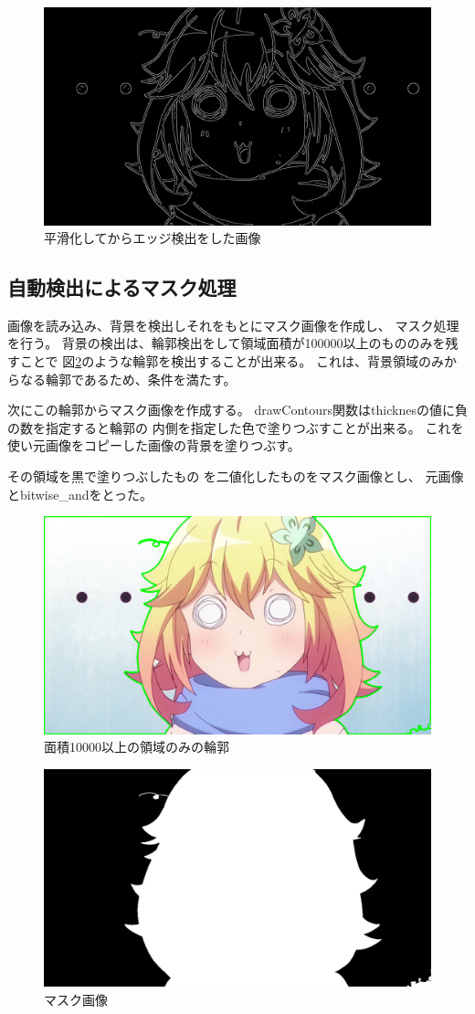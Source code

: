\documentclass[dvipdfmx]{jsarticle}
\begin{document}
\begin{figure}[htbp]
  \centering
  \includegraphics[width=0.7\hsize]{../pic/canny2.png}
  \caption{平滑化してからエッジ検出をした画像}
  \label{fig:canny2}
\end{figure}

\newpage
\subsection{自動検出によるマスク処理}

画像を読み込み、背景を検出しそれをもとにマスク画像を作成し、
マスク処理を行う。
背景の検出は、輪郭検出をして領域面積が100000以上のもののみを残すことで
図\ref{fig:contour_large}のような輪郭を検出することが出来る。
これは、背景領域のみからなる輪郭であるため、条件を満たす。

次にこの輪郭からマスク画像を作成する。
drawContours関数はthicknesの値に負の数を指定すると輪郭の
内側を指定した色で塗りつぶすことが出来る。
これを使い元画像をコピーした画像の背景を塗りつぶす。

その領域を黒で塗りつぶしたもの
を二値化したものをマスク画像とし、
元画像とbitwise\_andをとった。

\begin{figure}[H]
  \centering
  \includegraphics[width=0.7\hsize]{../pic/contour_large.png}
  \caption{面積10000以上の領域のみの輪郭}
  \label{fig:contour_large}
\end{figure}

\begin{figure}[H]
  \centering
  \includegraphics[width=0.7\hsize]{../pic/silhouette.png}
  \caption{マスク画像}
  \label{fig:mask}
\end{figure}
\end{document}
